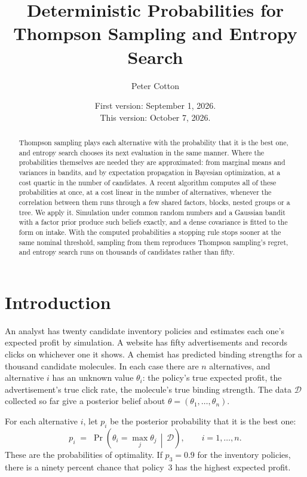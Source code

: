 \documentclass[11pt]{article}
\title{\textbf{Deterministic Probabilities for\\
Thompson Sampling and Entropy Search}}
\author{Peter Cotton}
\date{\normalsize First version: September 1, 2026.\\ This version: October 7, 2026.}
\begin{document}
\maketitle

\begin{abstract}
\noindent Thompson sampling plays each alternative with the
probability that it is the best one, and entropy search chooses its
next evaluation in the same manner. Where the probabilities
themselves are needed they are approximated: from marginal means and
variances in bandits, and by expectation propagation in Bayesian
optimization, at a cost quartic in the number of candidates. A recent algorithm \citep{cotton2026} computes all of these
probabilities at once, at a cost linear in the number of alternatives,
whenever the correlation between them runs through a few shared
factors, blocks, nested groups or a tree. We apply it. Simulation under common random numbers
and a Gaussian bandit with a factor prior produce such beliefs
exactly, and a dense covariance is fitted to the form on intake. With
the computed probabilities a stopping rule stops sooner at the same
nominal threshold, sampling from them reproduces Thompson sampling's
regret, and entropy search runs on thousands of candidates rather than
fifty.
\end{abstract}

\section{Introduction}

An analyst has twenty candidate inventory policies and estimates each
one's expected profit by simulation. A website has fifty
advertisements and records clicks on whichever one it shows. A chemist
has predicted binding strengths for a thousand candidate molecules. In
each case there are $n$ alternatives, and alternative $i$ has an
unknown value $\theta_i$: the policy's true expected profit, the
advertisement's true click rate, the molecule's true binding strength.
The data $\mathcal{D}$ collected so far give a posterior belief about
$\theta = (\theta_1, \dots, \theta_n)$.

For each alternative $i$, let $p_i$ be the posterior probability that it is the best one:
\begin{equation}
p_i \;=\; \Pr\!\left(\theta_i = \max_j \theta_j \,\middle|\,
\mathcal{D}\right), \qquad i = 1, \dots, n.
\label{eq:pom}
\end{equation}
These are the probabilities of optimality. If $p_3 = 0.9$ for the inventory policies, there
is a ninety percent chance that policy~3 has the highest expected
profit.
\end{document}

